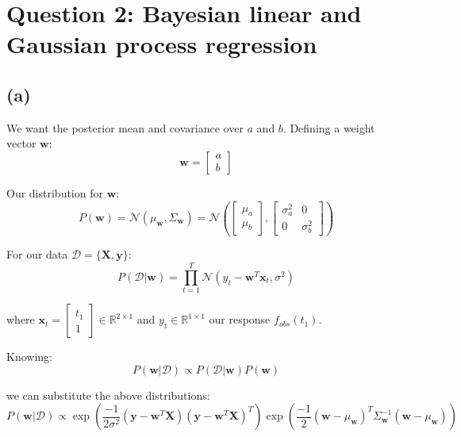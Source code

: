 \documentclass[12pt]{article}
\begin{document}
\newpage
\section*{Question 2: Bayesian linear and Gaussian process regression}

\subsection*{(a)}

We want the posterior mean and covariance over $a$ and $b$.
Defining a weight vector $\textbf{w}$:
\[\textbf{w} = \begin{bmatrix}
                 a \\
                 b
         \end{bmatrix}\]

Our distribution for $\textbf{w}$:
\[P(\textbf{w}) = \mathcal{N}(\mu_{\textbf{w}}, \Sigma_{\textbf{w}}) = \mathcal{N} \left(
\begin{bmatrix}
                 \mu_a \\
                 \mu_b
         \end{bmatrix} ,
\begin{bmatrix}
                 \sigma_a^2 & 0 \\
                 0 & \sigma_b^2
         \end{bmatrix}
\right)

\]


For our data $\mathcal{D} = \{\textbf{X}, \textbf{y}\}$:
\[P(\mathcal{D} | \textbf{w}) = \prod_{t=1}^{T}\mathcal{N} \left( y_t - \textbf{w}^T \textbf{x}_t, \sigma^2
\right)
\]

where $\textbf{x}_t =  \begin{bmatrix}
                 t_1 \\
                 1
         \end{bmatrix} \in  \mathbb{R}^{2 \times 1}$ and $y_t \in \mathbb{R}^{1 \times 1}$ our response $f_{obs}(t_1)$.

Knowing:
\[P(\textbf{w} | \mathcal{D}) \propto P(\mathcal{D} | \textbf{w}) P(\textbf{w})\]

we can substitute the above distributions:
\[P(\textbf{w} | \mathcal{D}) \propto
  \exp \left(\frac{-1}{2 \sigma^2} \left( \textbf{y} - \textbf{w}^T \textbf{X}\right) \left( \textbf{y} - \textbf{w}^T \textbf{X}\right)^T \right)
\exp \left(\frac{-1}{2} \left( \textbf{w} -\mu_{\textbf{w}}\right)^T \Sigma_{\textbf{w}}^{-1} \left( \textbf{w} -\mu_{\textbf{w}}\right)\right)
\]
\end{document}
